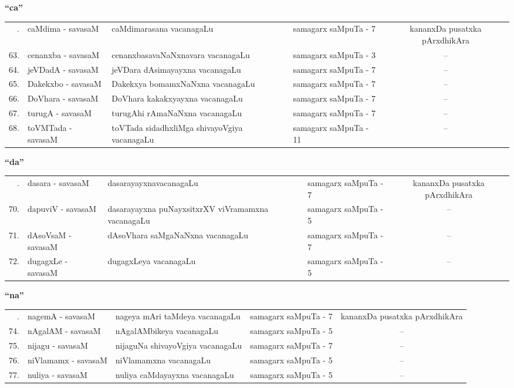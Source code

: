 \centerline{\bf ``ca''}

{\renewcommand{\arraystretch}{1.3}
\begin{longtable}{rl>{\raggedright}p{5.5cm}lc}
\hline
\endfirsthead
\hline
\endhead
\hline
\endfoot
\endlastfoot
62. &   caMdima - savasaM &  caMdimarasana vacanagaLu & samagarx saMpuTa - 7  & kananxDa pusatxka pArxdhikAra\\
63. &   cenanxba - savasaM &  cenanxbasavaNaNxnavara vacanagaLu & samagarx saMpuTa - 3 & --\\
64. &   jeVDadA - savasaM &  jeVDara dAsimayayxna vacanagaLu & samagarx saMpuTa - 7 & --\\
65. &  Dakekxbo - savasaM &  Dakekxya bomamxNaNxna vacanagaLu & samagarx saMpuTa - 7 & --\\
66. & DoVhara - savasaM & DoVhara kakakxyayxna vacanagaLu & samagarx saMpuTa - 7 & --\\
67. &  turugA - savasaM &  turugAhi rAmaNaNxna vacanagaLu & samagarx saMpuTa - 7 & --\\
68. &  toVMTada - savasaM & toVTada sidadhxliMga shivayoVgiya vacanagaLu & samagarx saMpuTa - 11 & --\\
\hline
\end{longtable}}

\centerline{\bf ``da''}

{\renewcommand{\arraystretch}{1.3}
\begin{longtable}{rl>{\raggedright}p{5.5cm}lc}
\hline
\endfirsthead
\hline
\endhead
\hline
\endfoot
\endlastfoot
69. &  dasara - savasaM &  dasarayayxnavacanagaLu & samagarx saMpuTa - 7 & kananxDa pusatxka pArxdhikAra\\
70. &  dapuviV - savasaM & dasarayayxna puNayxsitxrXV viVramamxna vacanagaLu & samagarx saMpuTa - 5 & --\\
71. &  dAsoVsaM - savasaM & dAsoVhara saMgaNaNxna vacanagaLu & samagarx saMpuTa - 7 & --\\
72. &  dugagxLe - savasaM & dugagxLeya vacanagaLu & samagarx saMpuTa - 5 & --\\
\hline
\end{longtable}}

\centerline{\bf ``na''}

{\renewcommand{\arraystretch}{1.3}
\begin{longtable}{rl>{\raggedright}p{5.5cm}lc}
\hline
\endfirsthead
\hline
\endhead
\hline
\endfoot
\endlastfoot
73. & nagemA - savasaM &  nageya mAri taMdeya vacanagaLu & samagarx saMpuTa - 7 & kananxDa pusatxka pArxdhikAra\\
74. & nAgalAM  - savasaM & nAgalAMbikeya vacanagaLu & samagarx saMpuTa - 5 & --\\
75. & nijagu  - savasaM & nijaguNa shivayoVgiya vacanagaLu & samagarx saMpuTa - 7 & --\\
76. & niVlamamx  - savasaM & niVlamamxna vacanagaLu & samagarx saMpuTa - 5 & --\\
77. & nuliya  - savasaM & nuliya caMdayayxna vacanagaLu & samagarx saMpuTa - 5 & --\\
\hline
\end{longtable}}

